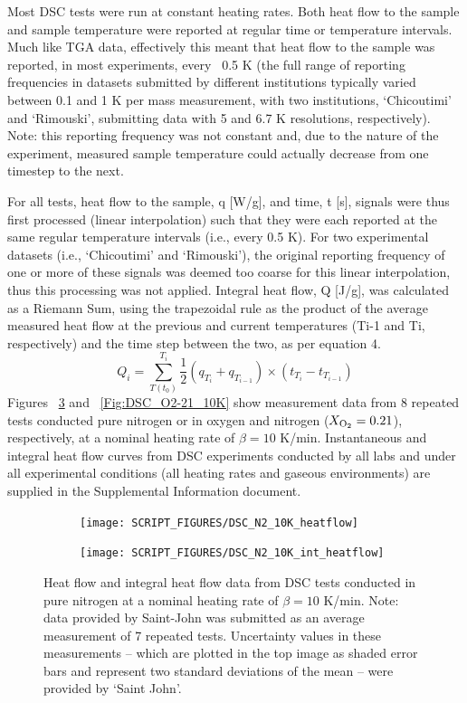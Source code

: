 \documentclass{book}
\begin{document}
Most DSC tests were run at constant heating rates. Both heat flow to the sample and sample temperature were reported at regular time or temperature intervals. Much like TGA data, effectively this meant that heat flow to the sample was reported, in most experiments, every ~0.5 K (the full range of reporting frequencies in datasets submitted by different institutions typically varied between 0.1 and 1 K per mass measurement, with two institutions, ‘Chicoutimi’ and ‘Rimouski’, submitting data with 5 and 6.7 K resolutions, respectively). Note: this reporting frequency was not constant and, due to the nature of the experiment, measured sample temperature could actually decrease from one timestep to the next.

For all tests, heat flow to the sample, q [W/g], and time, t [s], signals were thus first processed (linear interpolation) such that they were each reported at the same regular temperature intervals (i.e., every 0.5 K). For two experimental datasets (i.e., ‘Chicoutimi’ and ‘Rimouski’), the original reporting frequency of one or more of these signals was deemed too coarse for this linear interpolation, thus this processing was not applied. Integral heat flow, Q [J/g], was calculated as a Riemann Sum, using the trapezoidal rule as the product of the average measured heat flow at the previous and current temperatures (Ti-1 and Ti, respectively) and the time step between the two, as per equation 4.
\begin{equation}
Q_i=\sum_{T(t_0)}^{T_i}{\frac{1}{2}\left(q_{T_i}+q_{T_{i-1}}\right)\times\left(t_{T_i}-t_{T_{i-1}}\right)}
\end{equation}
Figures ~\ref{Fig:DSC_N2_10K} and ~\ref{Fig:DSC_O2-21_10K} show measurement data from 8 repeated tests conducted pure nitrogen or in oxygen and nitrogen ($X_{\rm O_2}=0.21$), respectively, at a nominal heating rate of $\beta=10$ K/min. Instantaneous and integral heat flow curves from DSC experiments conducted by all labs and under all experimental conditions (all heating rates and gaseous environments) are supplied in the Supplemental Information document.

\begin{figure}
\centering
\begin{subfigure}[b]{0.85\textwidth}
   \texttt{[image: SCRIPT\_FIGURES/DSC\_N2\_10K\_heatflow]}
   \caption{}
   \label{Fig:DSC_N2_10K_heatflow}
\end{subfigure}

\begin{subfigure}[b]{0.85\textwidth}
   \texttt{[image: SCRIPT\_FIGURES/DSC\_N2\_10K\_int\_heatflow]}
   \caption{}
   \label{Fig:DSC_N2_10K_int_heatflow}
\end{subfigure}

  \caption{Heat flow and integral heat flow data from DSC tests conducted in pure nitrogen at a nominal heating rate of $\beta=10$ K/min. Note: data provided by Saint-John was submitted as an average measurement of 7 repeated tests. Uncertainty values in these measurements – which are plotted in the top image as shaded error bars and represent two standard deviations of the mean – were provided by ‘Saint John’.}
  \label{Fig:DSC_N2_10K}
\end{figure}
\end{document}
